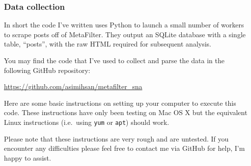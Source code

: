 \subsubsection{Data collection}

In short the code I've written uses Python to launch a small number of
workers to scrape posts off of MetaFilter. They output an SQLite
database with a single table, ``posts'', with the raw HTML required for
subsequent analysis.

You may find the code that I've used to collect and parse the data in
the following GitHub repository:

\url{https://github.com/asimihsan/metafilter_sna}

Here are some basic instructions on setting up your computer to execute
this code. These instructions have only been testing on Mac OS X but the
equivalent Linux instructions (i.e.~using \texttt{yum} or \texttt{apt})
should work.

Please note that these instructions are very rough and are untested. If
you encounter any difficulties please feel free to contact me via GitHub
for help, I'm happy to assist.

